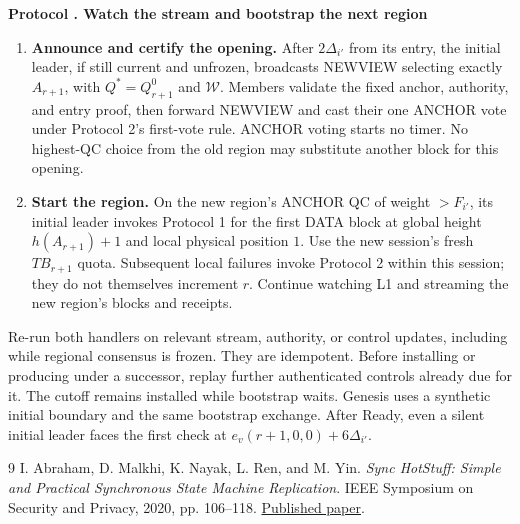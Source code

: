 \documentclass[11pt,a4paper]{article}
\newcounter{protocol}
\newenvironment{protocol}[2]{\refstepcounter{protocol}\label{#1}
\begin{mdframed}[nobreak=true,linewidth=.6pt,skipabove=8pt,skipbelow=8pt,
innertopmargin=7pt,innerbottommargin=7pt]\small
\textbf{Protocol \theprotocol. #2}\par\smallskip}{\end{mdframed}}
\begin{document}
\begin{protocol}{alg:bootstrap}{Watch the stream and bootstrap the next region}
\begin{enumerate}[label=\textbf{\arabic*)},itemsep=5pt]
\item \textbf{Announce and certify the opening.} After $2\Delta_{i'}$
from its entry, the initial leader, if still current and unfrozen,
broadcasts NEWVIEW selecting exactly $A_{r+1}$, with
$Q^*=Q_{r+1}^0$ and $\mathcal W$.
Members validate the fixed anchor, authority, and entry proof, then forward
NEWVIEW and cast their one ANCHOR vote under Protocol 2's first-vote rule.
ANCHOR voting starts no timer. No highest-QC choice from the old region
may substitute another block for this opening.

\item \textbf{Start the region.} On the new region's ANCHOR QC of weight
$>F_{i'}$, its initial leader invokes Protocol 1 for the first DATA block
at global height $h(A_{r+1})+1$ and local physical position $1$.
Use the new session's fresh $TB_{r+1}$ quota. Subsequent local failures
invoke Protocol 2 within this session; they do not themselves increment $r$.
Continue watching L1 and streaming the new region's blocks and receipts.
\end{enumerate}
\end{protocol}

Re-run both handlers on relevant stream, authority, or control updates,
including while regional consensus is frozen. They are idempotent.
Before installing or producing under a successor, replay further
authenticated controls already due for it. The cutoff remains installed
while bootstrap waits. Genesis uses a synthetic initial boundary and
the same bootstrap exchange. After Ready, even a silent initial leader
faces the first check at $e_v(r+1,0,0)+6\Delta_{i'}$.

\begin{thebibliography}{9}
I. Abraham, D. Malkhi, K. Nayak, L. Ren, and M. Yin.
\emph{Sync HotStuff: Simple and Practical Synchronous State Machine Replication}.
IEEE Symposium on Security and Privacy, 2020, pp. 106--118.
\href{https://conferences.computer.org/sp/pdfs/sp/2020/349700a106.pdf}{Published paper}.
\end{thebibliography}
\end{document}
